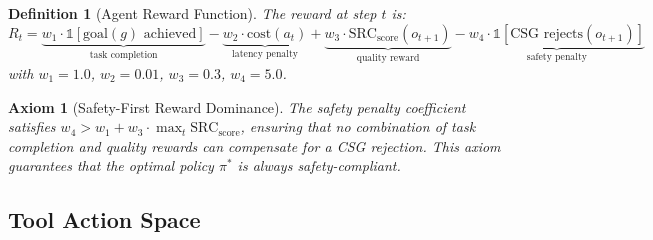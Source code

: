 \documentclass[10pt,conference]{IEEEtran}
\theoremstyle{ieeethm}
\theoremstyle{ieeedef}
\newtheorem{definition}[theorem]{Definition}
\newtheorem{axiom}{Axiom}
\theoremstyle{ieeeremark}
\begin{document}
\begin{definition}[Agent Reward Function]
\label{def:reward}
The reward at step $t$ is:
\begin{equation}
R_t = \underbrace{w_1 \cdot \mathbb{1}[\text{goal}(g) \text{ achieved}]}_{\text{task completion}}
    - \underbrace{w_2 \cdot \text{cost}(a_t)}_{\text{latency penalty}}
    + \underbrace{w_3 \cdot \text{SRC}_\text{score}(o_{t+1})}_{\text{quality reward}}
    - \underbrace{w_4 \cdot \mathbb{1}[\text{CSG rejects}(o_{t+1})]}_{\text{safety penalty}}
\label{eq:reward}
\end{equation}
with $w_1{=}1.0$, $w_2{=}0.01$, $w_3{=}0.3$, $w_4{=}5.0$.
\end{definition}

\begin{axiom}[Safety-First Reward Dominance]
\label{ax:safety_dominance}
The safety penalty coefficient satisfies $w_4 > w_1 + w_3 \cdot \max_t \text{SRC}_\text{score}$, ensuring that no combination of task completion and quality rewards can compensate for a CSG rejection. This axiom guarantees that the optimal policy $\pi^*$ is always safety-compliant.
\end{axiom}

\subsection{Tool Action Space}
\end{document}

